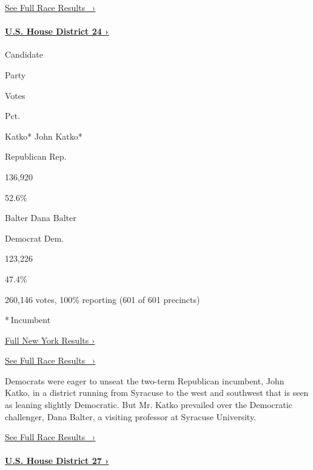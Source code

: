\href{https://www.nytimes3xbfgragh.onion/elections/results/new-york-house-district-22}{See
Full Race Results~ ›}

\hypertarget{us-house-district-24-}{%
\paragraph{\texorpdfstring{\href{https://www.nytimes3xbfgragh.onion/elections/results/new-york-house-district-24}{U.S.
House District 24
›}}{U.S. House District 24 ›}}\label{us-house-district-24-}}

Candidate

Party

Votes

Pct.

 Katko* John Katko*

Republican Rep.

136,920

52.6\%

 Balter Dana Balter

Democrat Dem.

123,226

47.4\%

260,146 votes, 100\% reporting (601 of 601 precincts)

* Incumbent

\href{https://www.nytimes3xbfgragh.onion/interactive/2018/11/06/us/elections/results-new-york-elections.html}{Full
New York Results ›}

\href{https://www.nytimes3xbfgragh.onion/elections/results/new-york-house-district-24}{See
Full Race Results~ ›}

Democrats were eager to unseat the two-term Republican incumbent, John
Katko, in a district running from Syracuse to the west and southwest
that is seen as leaning slightly Democratic. But Mr. Katko prevailed
over the Democratic challenger, Dana Balter, a visiting professor at
Syracuse University.

\href{https://www.nytimes3xbfgragh.onion/elections/results/new-york-house-district-24}{See
Full Race Results~ ›}

\hypertarget{us-house-district-27-}{%
\paragraph{\texorpdfstring{\href{https://www.nytimes3xbfgragh.onion/elections/results/new-york-house-district-27}{U.S.
House District 27
›}}{U.S. House District 27 ›}}\label{us-house-district-27-}}


